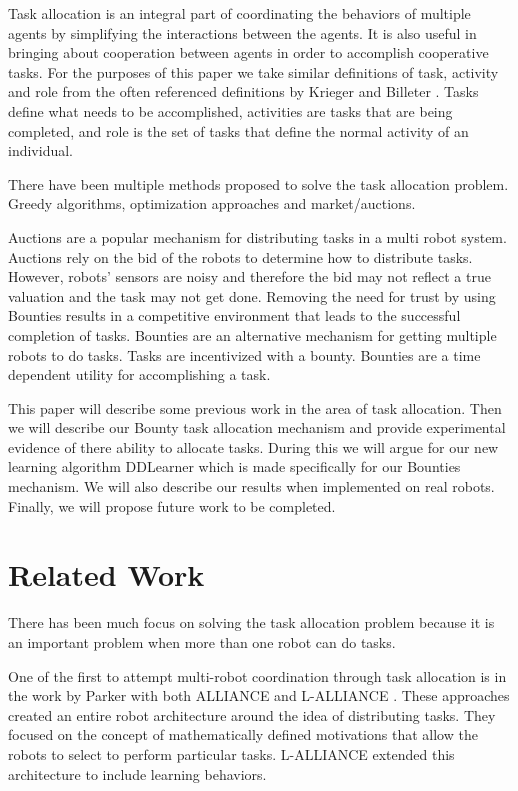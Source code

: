 \documentclass[twocolumn]{article}
\begin{document}
Task allocation is an integral part of coordinating the behaviors of multiple agents by simplifying the interactions between the agents.  It is also useful in bringing about cooperation between agents in order to accomplish cooperative tasks.  For the purposes of this paper we take similar definitions of task, activity and role from the often referenced definitions by Krieger and Billeter \cite{Krieger2000}.  Tasks define what needs to be accomplished, activities are tasks that are being completed, and role is the set of tasks that define the normal activity of an individual.

There have been multiple methods proposed to solve the task allocation problem.  Greedy algorithms, optimization approaches and market/auctions.  

Auctions are a popular mechanism for distributing tasks in a multi robot system.  Auctions rely on the bid of the robots to determine how to distribute tasks.  However, robots' sensors are noisy and therefore the bid may not reflect a true valuation and the task may not get done.  Removing the need for trust by using Bounties results in a competitive environment that leads to the successful completion of tasks.
Bounties are an alternative mechanism for getting multiple robots to do tasks.  Tasks are incentivized with a bounty.  Bounties are a time dependent utility for accomplishing a task.  

This paper will describe some previous work in the area of task allocation.  Then we will describe our Bounty task allocation mechanism and provide experimental evidence of there ability to allocate tasks.  During this we will argue for our new learning algorithm DDLearner which is made specifically for our Bounties mechanism.  We will also describe our results when implemented on real robots.  Finally, we will propose future work to be completed.

\section{Related Work}
There has been much focus on solving the task allocation problem because it is an important problem when more than one robot can do tasks.  

One of the first to attempt multi-robot coordination through task allocation is in the work by Parker with both ALLIANCE and L-ALLIANCE \cite{Parker1998,Parker1995}.  These approaches created an entire robot architecture around the idea of distributing tasks.  They focused on the concept of mathematically defined motivations that allow the robots to select to perform particular tasks.  L-ALLIANCE extended this architecture to include learning behaviors. 
\end{document}
